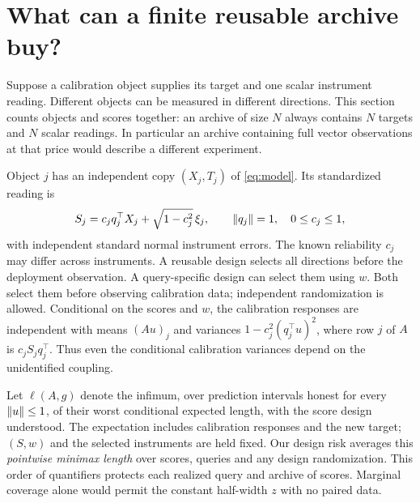 \section{What can a finite reusable archive buy?}\label{sec:finite}
Suppose a calibration object supplies its target and one scalar instrument reading. Different objects can be measured in different directions. This section counts objects and scores together: an archive of size $N$ always contains $N$ targets and $N$ scalar readings. In particular an archive containing full vector observations at that price would describe a different experiment.

Object $j$ has an independent copy $(X_j,T_j)$ of \eqref{eq:model}. Its standardized reading is
\[
 S_j=c_j q_j^\top X_j+\sqrt{1-c_j^2}\,\xi_j,\qquad
 \lVert q_j\rVert=1,\quad 0\le c_j\le1 ,
\]
with independent standard normal instrument errors. The known reliability $c_j$ may differ across instruments. A reusable design selects all directions before the deployment observation. A query-specific design can select them using $w$. Both select them before observing calibration data; independent randomization is allowed. Conditional on the scores and $w$, the calibration responses are independent with means $(Au)_j$ and variances $1-c_j^2(q_j^\top u)^2$, where row $j$ of $A$ is $c_j S_j q_j^\top$. Thus even the conditional calibration variances depend on the unidentified coupling.

Let $\ell(A,g)$ denote the infimum, over prediction intervals honest for every $\lVert u\rVert\le1$, of their worst conditional expected length, with the score design understood. The expectation includes calibration responses and the new target; $(S,w)$ and the selected instruments are held fixed. Our design risk averages this \emph{pointwise minimax length} over scores, queries and any design randomization. This order of quantifiers protects each realized query and archive of scores. Marginal coverage alone would permit the constant half-width $z$ with no paired data.

